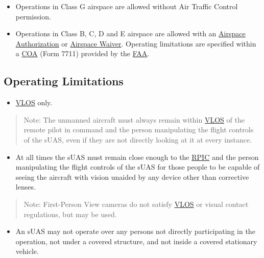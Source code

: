 \documentclass[
]{book}
\providecommand{\tightlist}{%
  \setlength{\itemsep}{0pt}\setlength{\parskip}{0pt}}
\begin{document}
\begin{itemize}
\tightlist
\item
  Operations in Class G airspace are allowed without Air Traffic Control permission.
\item
  Operations in Class B, C, D and E airspace are allowed with an \protect\hyperlink{AA}{Airspace Authorization} or \protect\hyperlink{AW}{Airspace Waiver}. Operating limitations are specified within a \protect\hyperlink{COA}{COA} (Form 7711) provided by the \protect\hyperlink{FAA}{FAA}.
\end{itemize}

\hypertarget{operating-limitations}{%
\subsection{Operating Limitations}\label{operating-limitations}}

\begin{itemize}
\tightlist
\item
  \protect\hyperlink{VLOS}{VLOS} only.
\end{itemize}

\begin{quote}
Note: The unmanned aircraft must always remain within \protect\hyperlink{VLOS}{VLOS} of the remote pilot in command and the person manipulating the flight controls of the sUAS, even if they are not directly looking at it at every instance.
\end{quote}

\begin{itemize}
\tightlist
\item
  At all times the sUAS must remain close enough to the \protect\hyperlink{RPIC}{RPIC} and the person manipulating the flight controls of the sUAS for those people to be capable of seeing the aircraft with vision unaided by any device other than corrective lenses.
\end{itemize}

\begin{quote}
Note: First-Person View cameras do not satisfy \protect\hyperlink{VLOS}{VLOS} or visual contact regulations, but may be used.
\end{quote}

\begin{itemize}
\tightlist
\item
  An sUAS may not operate over any persons not directly participating in the operation, not under a covered structure, and not inside a covered stationary vehicle.
\end{itemize}
\end{document}
